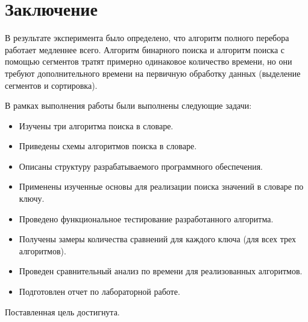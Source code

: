 \chapter*{Заключение}

В результате эксперимента было определено, что алгоритм полного перебора работает медленнее всего. Алгоритм бинарного поиска и алгоритм поиска с помощью сегментов тратят примерно одинаковое количество времени, но они требуют дополнительного времени на первичную обработку данных (выделение сегментов и сортировка).


В рамках выполнения работы были выполнены следующие задачи:
\begin{itemize}
	\item Изучены три алгоритма поиска в словаре.
	\item Приведены схемы алгоритмов поиска в словаре.
	\item Описаны структуру разрабатываемого программного обеспечения.
	\item Применены изученные основы для реализации поиска значений в словаре по ключу.
	\item Проведено функциональное тестирование разработанного алгоритма.
	\item Получены замеры количества сравнений для каждого ключа (для всех трех алгоритмов).
	\item Проведен сравнительный анализ по времени для реализованных алгоритмов.
	\item Подготовлен отчет по лабораторной работе.
\end{itemize}


Поставленная цель достигнута.

